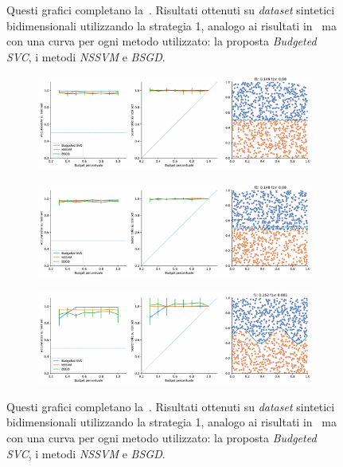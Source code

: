\begin{appendices}
\begin{figure}[b!]
\begin{subfigure}{.8\textwidth}
    \end{subfigure}
    \caption[Risultati su \emph{dataset} sintetici utilizzando strategia 1 in confronto ad altri metodi.]{Questi grafici completano la~. Risultati ottenuti su \emph{dataset} sintetici bidimensionali utilizzando la strategia 1, analogo ai risultati in~ ma con una curva per ogni metodo utilizzato: la proposta \emph{Budgeted SVC}, i metodi \emph{NSSVM} e \emph{BSGD}.}
\end{figure}
\begin{figure}[ht]\ContinuedFloat
    \centering
    \begin{subfigure}{.8\textwidth}
        \centering
        \includegraphics[width=\textwidth]{img/comp_old/6.pdf}
    \end{subfigure}%
    \hfill
    \begin{subfigure}{.8\textwidth}
        \centering
        \includegraphics[width=\textwidth]{img/comp_old/7.pdf}
    \end{subfigure}
    \hfill
    \begin{subfigure}{.8\textwidth}
        \centering
        \includegraphics[width=\textwidth]{img/comp_old/11.pdf}
    \end{subfigure}%
    \caption[Risultati su \emph{dataset} sintetici utilizzando strategia 1 in confronto ad altri metodi.]{Questi grafici completano la~. Risultati ottenuti su \emph{dataset} sintetici bidimensionali utilizzando la strategia 1, analogo ai risultati in~ ma con una curva per ogni metodo utilizzato: la proposta \emph{Budgeted SVC}, i metodi \emph{NSSVM} e \emph{BSGD}.}
\end{figure}


\end{appendices}
